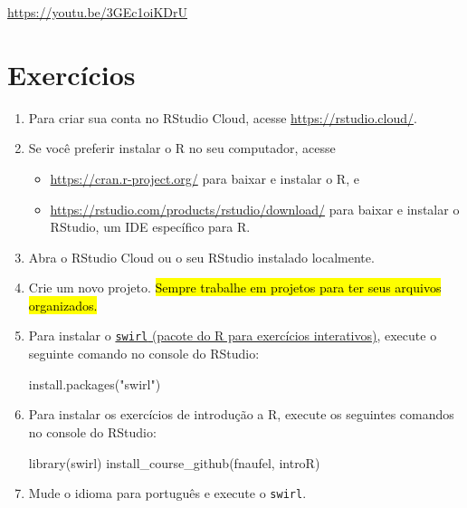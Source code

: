 \documentclass[
  11pt]{report}
\newenvironment{Shaded}{\begin{snugshade}}{\end{snugshade}}
\newcommand{\FunctionTok}[1]{\textcolor[rgb]{0.00,0.00,0.00}{#1}}
\newcommand{\NormalTok}[1]{#1}
\newcommand{\StringTok}[1]{\textcolor[rgb]{0.31,0.60,0.02}{#1}}
\renewenvironment{Shaded}{
    \begin{mdframed}[%
      roundcorner=2pt,%
      innerleftmargin=5pt,%
      innerrightmargin=5pt,%
      topline=true,%
      leftline=true,%
      rightline=true,%
      bottomline=true,%
      linewidth=0.5pt,%
      linecolor=black!20,%
      backgroundcolor=black!2,%
      skipabove=2ex,%
      skipbelow=2.5ex%
    ]%
  }
  {
    \end{mdframed}
  }
\begin{document}
\begin{center} \url{https://youtu.be/3GEc1oiKDrU} \end{center}

\hypertarget{exercuxedcios-2}{%
\section{Exercícios}\label{exercuxedcios-2}}

\begin{enumerate}
\def\labelenumi{\arabic{enumi}.}
\item
  Para criar sua conta no RStudio Cloud, acesse \url{https://rstudio.cloud/}.
\item
  Se você preferir instalar o R no seu computador, acesse

  \begin{itemize}
  \item
    \url{https://cran.r-project.org/} para baixar e instalar o R, e
  \item
    \url{https://rstudio.com/products/rstudio/download/} para baixar e instalar o RStudio, um IDE específico para R.
  \end{itemize}
\item
  Abra o RStudio Cloud ou o seu RStudio instalado localmente.
\item
  Crie um novo projeto. {\hl{Sempre trabalhe em projetos para ter seus arquivos organizados.}}
\item
  Para instalar o \href{https://swirlstats.com/}{\texttt{swirl} (pacote do R para exercícios interativos)}, execute o seguinte comando no console do RStudio:

\begin{Shaded}
\begin{Highlighting}[]
\FunctionTok{install.packages}\NormalTok{(}\StringTok{"swirl"}\NormalTok{)}
\end{Highlighting}
\end{Shaded}
\item
  Para instalar os exercícios de introdução a R, execute os seguintes comandos no console do RStudio:

\begin{Shaded}
\begin{Highlighting}[]
\FunctionTok{library}\NormalTok{(swirl)}
\FunctionTok{install\_course\_github}\NormalTok{(}\StringTok{\textquotesingle{}fnaufel\textquotesingle{}}\NormalTok{, }\StringTok{\textquotesingle{}introR\textquotesingle{}}\NormalTok{)}
\end{Highlighting}
\end{Shaded}
\item
  Mude o idioma para português e execute o \texttt{swirl}.


\end{enumerate}
\end{document}
